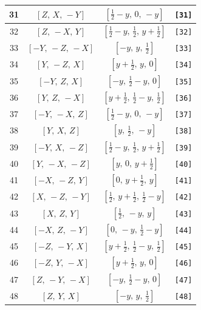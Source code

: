 \documentclass[fleqn,8pt]{jsarticle}
\begin{document}
\begin{longtable}{cccc}
31 & $\left[ Z,\, X,\, - Y \right]$ & $\left[ \frac{1}{2} - y,\, 0,\, - y \right]$ & {\tt [31]} \\ \hline
32 & $\left[ Z,\, - X,\, Y \right]$ & $\left[ \frac{1}{2} - y,\, \frac{1}{2},\, y + \frac{1}{2} \right]$ & {\tt [32]} \\ \hline
33 & $\left[ - Y,\, - Z,\, - X \right]$ & $\left[ - y,\, y,\, \frac{1}{2} \right]$ & {\tt [33]} \\ \hline
34 & $\left[ Y,\, - Z,\, X \right]$ & $\left[ y + \frac{1}{2},\, y,\, 0 \right]$ & {\tt [34]} \\ \hline
35 & $\left[ - Y,\, Z,\, X \right]$ & $\left[ - y,\, \frac{1}{2} - y,\, 0 \right]$ & {\tt [35]} \\ \hline
36 & $\left[ Y,\, Z,\, - X \right]$ & $\left[ y + \frac{1}{2},\, \frac{1}{2} - y,\, \frac{1}{2} \right]$ & {\tt [36]} \\ \hline
37 & $\left[ - Y,\, - X,\, Z \right]$ & $\left[ \frac{1}{2} - y,\, 0,\, - y \right]$ & {\tt [37]} \\ \hline
38 & $\left[ Y,\, X,\, Z \right]$ & $\left[ y,\, \frac{1}{2},\, - y \right]$ & {\tt [38]} \\ \hline
39 & $\left[ - Y,\, X,\, - Z \right]$ & $\left[ \frac{1}{2} - y,\, \frac{1}{2},\, y + \frac{1}{2} \right]$ & {\tt [39]} \\ \hline
40 & $\left[ Y,\, - X,\, - Z \right]$ & $\left[ y,\, 0,\, y + \frac{1}{2} \right]$ & {\tt [40]} \\ \hline
41 & $\left[ - X,\, - Z,\, Y \right]$ & $\left[ 0,\, y + \frac{1}{2},\, y \right]$ & {\tt [41]} \\ \hline
42 & $\left[ X,\, - Z,\, - Y \right]$ & $\left[ \frac{1}{2},\, y + \frac{1}{2},\, \frac{1}{2} - y \right]$ & {\tt [42]} \\ \hline
43 & $\left[ X,\, Z,\, Y \right]$ & $\left[ \frac{1}{2},\, - y,\, y \right]$ & {\tt [43]} \\ \hline
44 & $\left[ - X,\, Z,\, - Y \right]$ & $\left[ 0,\, - y,\, \frac{1}{2} - y \right]$ & {\tt [44]} \\ \hline
45 & $\left[ - Z,\, - Y,\, X \right]$ & $\left[ y + \frac{1}{2},\, \frac{1}{2} - y,\, \frac{1}{2} \right]$ & {\tt [45]} \\ \hline
46 & $\left[ - Z,\, Y,\, - X \right]$ & $\left[ y + \frac{1}{2},\, y,\, 0 \right]$ & {\tt [46]} \\ \hline
47 & $\left[ Z,\, - Y,\, - X \right]$ & $\left[ - y,\, \frac{1}{2} - y,\, 0 \right]$ & {\tt [47]} \\ \hline
48 & $\left[ Z,\, Y,\, X \right]$ & $\left[ - y,\, y,\, \frac{1}{2} \right]$ & {\tt [48]} \\
\end{longtable}
\end{document}

